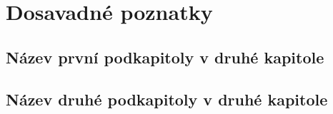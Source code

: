 \chapter{Dosavadné poznatky}

\section{Název první podkapitoly v druhé kapitole}

\section{Název druhé podkapitoly v druhé kapitole}


